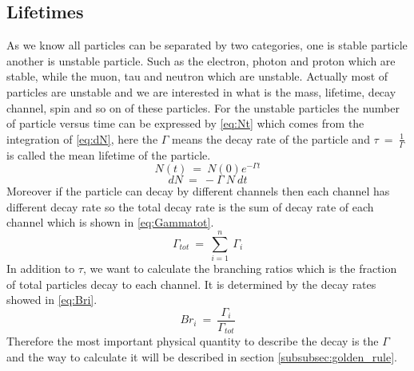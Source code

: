 \subsection{Lifetimes}\label{subsubsec:Lifetime}
As we know all particles can be separated by two categories, one is stable particle another is unstable particle. Such as the electron, photon and proton which are stable, while the muon, tau and neutron which are unstable. Actually most of particles are unstable and we are interested in what is the mass, lifetime, decay channel, spin and so on of these particles.
For the unstable particles the number of particle versus time can be expressed by \ref{eq:Nt} which comes from the integration of \ref{eq:dN}, here the $\Gamma$ means the decay rate of the particle and $\tau~=~\frac{1}{\Gamma}$ is called the mean lifetime of the particle.
\begin{equation}
N(t)~=~N(0)e^{-\Gamma t}
\label{eq:Nt}
\end{equation}
\begin{equation}
dN~=~-\Gamma~N~dt
\label{eq:dN}
\end{equation}
Moreover if the particle can decay by different channels then each channel has different decay rate so the total decay rate is the sum of decay rate of each channel which is shown in \ref{eq:Gammatot}.
\begin{equation}
\Gamma_{tot}~=~\sum^{n}_{i=1}~\Gamma_{i}
\label{eq:Gammatot}
\end{equation}
In addition to $\tau$, we want to calculate the branching ratios which is the fraction of total particles decay to each channel. It is determined by the decay rates showed in \ref{eq:Bri}.
\begin{equation}
Br_{i}~=~\frac{\Gamma_{i}}{\Gamma_{tot}}
\label{eq:Bri}
\end{equation}
Therefore the most important physical quantity to describe the decay is the $\Gamma$ and the way to calculate it will be described in section \ref{subsubsec:golden_rule}.

